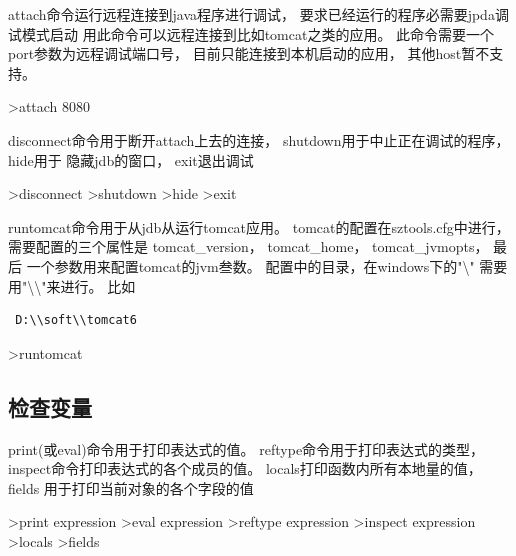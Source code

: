 \documentclass[oneside,openany]{book}
\begin{document}
    attach命令运行远程连接到java程序进行调试， 要求已经运行的程序必需要jpda调试模式启动
    用此命令可以远程连接到比如tomcat之类的应用。 此命令需要一个port参数为远程调试端口号， 
    目前只能连接到本机启动的应用， 其他host暂不支持。
    \begin{mdframed}[style=SmallFrame]
    \begin{flushleft}
    >attach 8080              
    \end{flushleft}
    \end{mdframed}
    \vspace{4mm}

    disconnect命令用于断开attach上去的连接， shutdown用于中止正在调试的程序， hide用于
    隐藏jdb的窗口， exit退出调试 
    \begin{mdframed}[style=SmallFrame]
     \begin{flushleft}
    >disconnect\newline
    >shutdown\newline
    >hide\newline
    >exit                      
    \end{flushleft}
    \end{mdframed}
    \vspace{5mm}

    runtomcat命令用于从jdb从运行tomcat应用。 tomcat的配置在sztools.cfg中进行， 
    需要配置的三个属性是 tomcat\_version， tomcat\_home， tomcat\_jvmopts， 最后
    一个参数用来配置tomcat的jvm叁数。 配置中的目录，在windows下的"\textbackslash"
    需要用"\textbackslash\textbackslash"来进行。 比如
    \begin{verbatim} D:\\soft\\tomcat6 \end{verbatim}
    \begin{mdframed}[style=SmallFrame]
     \begin{flushleft}
      >runtomcat
     \end{flushleft}
    \end{mdframed}

  \subsection{检查变量}
    print(或eval)命令用于打印表达式的值。 reftype命令用于打印表达式的类型，
  inspect命令打印表达式的各个成员的值。 locals打印函数内所有本地量的值， fields
  用于打印当前对象的各个字段的值
    \begin{mdframed}[style=SmallFrame]
      \begin{flushleft}
      >print expression\newline
      >eval expression\newline
      >reftype expression\newline                      
      >inspect expression\newline                      
      >locals\newline                      
      >fields
      \end{flushleft}
    \end{mdframed}
\end{document}
